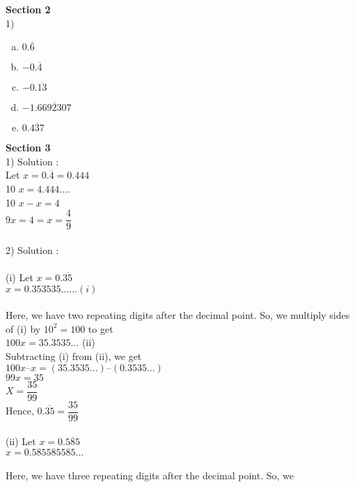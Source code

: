 \documentclass[a4paper,10pt]{article}
\begin{document}
\large{\textbf{Section 2}\\
1)
\begin{multicols}{5}
\begin{enumerate}[a.]
\item $0.\overline{6}$
 \item $-0.\overline{4}$
 \item $-0.\overline{13}$  
 \item $-1.\overline{6692307}$ 
 \item $0.\overline{437}$ 
\end{enumerate}
\end{multicols}
\noindent  \large{\textbf{Section 3}\\
1)
Solution :\\
Let $x = 0.\overline{4} = 0.444$\\
10 $x = 4.444....$\\
10 $ x - x = 4$\\
$9x  = 4 = x = \dfrac{4}{9}$\\\\
2)  Solution :\\\\
(i) Let $x = 0.\overline{35}$\\
$x = 0.353535......(i)$\\\\
Here, we have two repeating digits after the decimal point. So, we
multiply sides of (i) by $10^2 = 100$ to get\\
$100 x = 35.3535$... (ii)\\
Subtracting (i) from (ii), we get\\
$100x –x = (35.3535...) – (0.3535...)$\\
$99x = 35$\\
$X = \dfrac{35}{99}$\\
Hence, $0.\overline{35} = \dfrac{35}{99}$\\\\
(ii) Let $x = 0.\overline{585}$\\
$x = 0.585585585...$\\\\
Here, we have three repeating digits after the decimal point. So, we
}}
\end{document}
